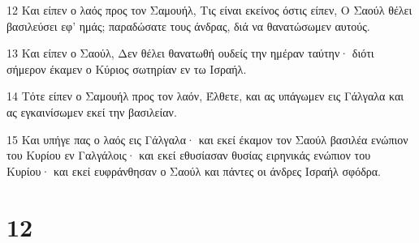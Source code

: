 \par 12 Και είπεν ο λαός προς τον Σαμουήλ, Τις είναι εκείνος όστις είπεν, Ο Σαούλ θέλει βασιλεύσει εφ' ημάς; παραδώσατε τους άνδρας, διά να θανατώσωμεν αυτούς.
\par 13 Και είπεν ο Σαούλ, Δεν θέλει θανατωθή ουδείς την ημέραν ταύτην· διότι σήμερον έκαμεν ο Κύριος σωτηρίαν εν τω Ισραήλ.
\par 14 Τότε είπεν ο Σαμουήλ προς τον λαόν, Έλθετε, και ας υπάγωμεν εις Γάλγαλα και ας εγκαινίσωμεν εκεί την βασιλείαν.
\par 15 Και υπήγε πας ο λαός εις Γάλγαλα· και εκεί έκαμον τον Σαούλ βασιλέα ενώπιον του Κυρίου εν Γαλγάλοις· και εκεί εθυσίασαν θυσίας ειρηνικάς ενώπιον του Κυρίου· και εκεί ευφράνθησαν ο Σαούλ και πάντες οι άνδρες Ισραήλ σφόδρα.

\chapter{12}


